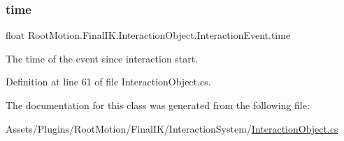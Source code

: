\subsubsection{\texorpdfstring{time}{time}}
{\footnotesize\ttfamily float Root\+Motion.\+Final\+I\+K.\+Interaction\+Object.\+Interaction\+Event.\+time}



The time of the event since interaction start. 



Definition at line 61 of file Interaction\+Object.\+cs.



The documentation for this class was generated from the following file\+:\begin{DoxyCompactItemize}
\item 
Assets/\+Plugins/\+Root\+Motion/\+Final\+I\+K/\+Interaction\+System/\mbox{\hyperlink{_interaction_object_8cs}{Interaction\+Object.\+cs}}\end{DoxyCompactItemize}
